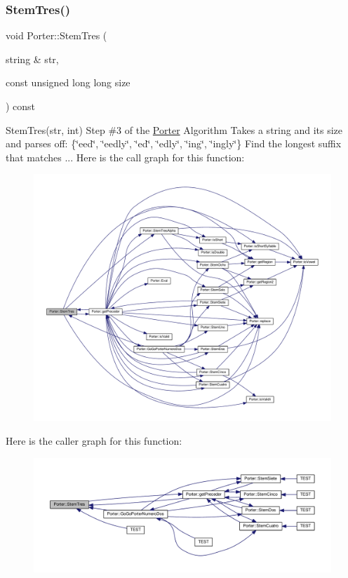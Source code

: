 \mbox{\label{class_porter_a4aadb1440bc5f143aba28641cab26ff6}} 
\subsubsection{\texorpdfstring{Stem\+Tres()}{StemTres()}}
{\footnotesize\ttfamily void Porter\+::\+Stem\+Tres (\begin{DoxyParamCaption}\item[{string \&}]{str,  }\item[{const unsigned long long}]{size }\end{DoxyParamCaption}) const}

Stem\+Tres(str, int) Step \#3 of the \hyperlink{class_porter}{Porter} Algorithm Takes a string and its size and parses off\+: \{\char`\"{}eed\char`\"{}, \char`\"{}eedly\char`\"{}, \char`\"{}ed\char`\"{}, \char`\"{}edly\char`\"{}, \char`\"{}ing\char`\"{}, \char`\"{}ingly\char`\"{}\} Find the longest suffix that matches ... Here is the call graph for this function\+:
\nopagebreak
\begin{figure}[H]
\begin{center}
\leavevmode
\includegraphics[width=350pt]{class_porter_a4aadb1440bc5f143aba28641cab26ff6_cgraph}
\end{center}
\end{figure}
Here is the caller graph for this function\+:
\nopagebreak
\begin{figure}[H]
\begin{center}
\leavevmode
\includegraphics[width=350pt]{class_porter_a4aadb1440bc5f143aba28641cab26ff6_icgraph}
\end{center}
\end{figure}
